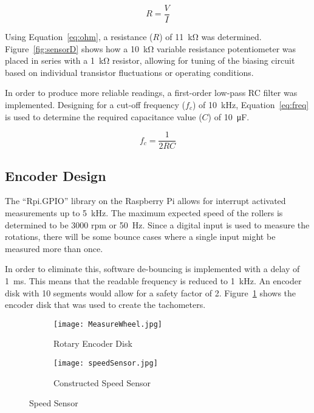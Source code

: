 \begin{equation}
	R = \frac{V}{I}
	\label{eq:ohm}
\end{equation}

Using Equation~\ref{eq:ohm}, a resistance ($R$) of \SI{11}{\kilo\ohm} was determined. Figure~\ref{fig:sensorD} shows how a \SI{10}{\kilo\ohm} variable resistance potentiometer was placed in series with a \SI{1}{\kilo\ohm} resistor, allowing for tuning of the biasing circuit based on individual transistor fluctuations or operating conditions. 

In order to produce more reliable readings, a first-order low-pass RC filter was implemented. Designing for a cut-off frequency ($f_c$) of \SI{10}{\kilo\hertz}, Equation~\ref{eq:freq} is used to determine the required capacitance value ($C$) of \SI{10}{\micro\farad}.

\begin{equation}
	f_c = \frac{1}{2 R C}
	\label{eq:freq}
\end{equation}

\subsection{Encoder Design}

The ``Rpi.GPIO'' library on the Raspberry Pi allows for interrupt activated measurements up to \SI{5}{\kilo\hertz}. The maximum expected speed of the rollers is determined to be 3000 \ac{rpm} or \SI{50}{\hertz}. Since a digital input is used to measure the rotations, there will be some bounce cases where a single input might be measured more than once. 

In order to eliminate this, software de-bouncing is implemented with a delay of \SI{1}{\milli\second}. This means that the readable frequency is reduced to \SI{1}{\kilo\hertz}. An encoder disk with 10 segments would allow for a safety factor of 2. Figure~\ref{fig:spdDisk} shows the encoder disk that was used to create the tachometers.

\begin{figure}[H]
	\centering
	\begin{subfigure}[t]{.3\textwidth}
		\centering
		\texttt{[image: MeasureWheel.jpg]}
		\caption{Rotary Encoder Disk}
		\label{fig:spdDisk}
	\end{subfigure}
\hfill
	\begin{subfigure}[t]{.65\textwidth}
		\centering
		\texttt{[image: speedSensor.jpg]}
		\caption{Constructed Speed Sensor}
		\label{fig:spdSensor}
	\end{subfigure}
	\caption{Speed Sensor}
	\label{fig:spd}
\end{figure}

